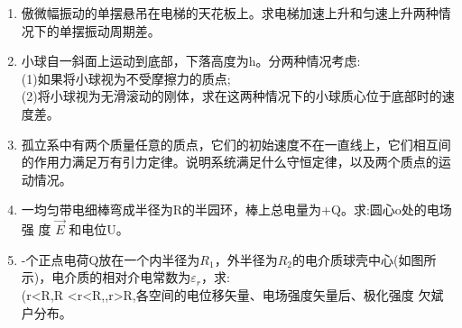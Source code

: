 \begin{enumerate}
\item 傲微幅振动的单摆悬吊在电梯的天花板上。求电梯加速上升和匀速上升两种情况下的单摆振动周期差。
\item 小球自一斜面上运动到底部，下落高度为h。分两种情况考虑:\\
(1)如果将小球视为不受摩擦力的质点;\\
(2)将小球视为无滑滚动的刚体，求在这两种情况下的小球质心位于底部时的速度差。
\item 孤立系中有两个质量任意的质点，它们的初始速度不在一直线上，它们相互间的作用力满足万有引力定律。说明系统满足什么守恒定律，以及两个质点的运动情况。
\item 一均匀带电细棒弯成半径为R的半园环，棒上总电量为+Q。求:圆心o处的电场强
度 $\vec{E}$ 和电位U。
\item -个正点电荷Q放在一个内半径为$R_1$，外半径为$R_2$的电介质球壳中心(如图所示)，电介质的相对介电常数为$\varepsilon_r$，求:\\
(r<R,R <r<R,,r>R,各空间的电位移矢量、电场强度矢量后、极化强度
欠斌户分布。
\end{enumerate}
